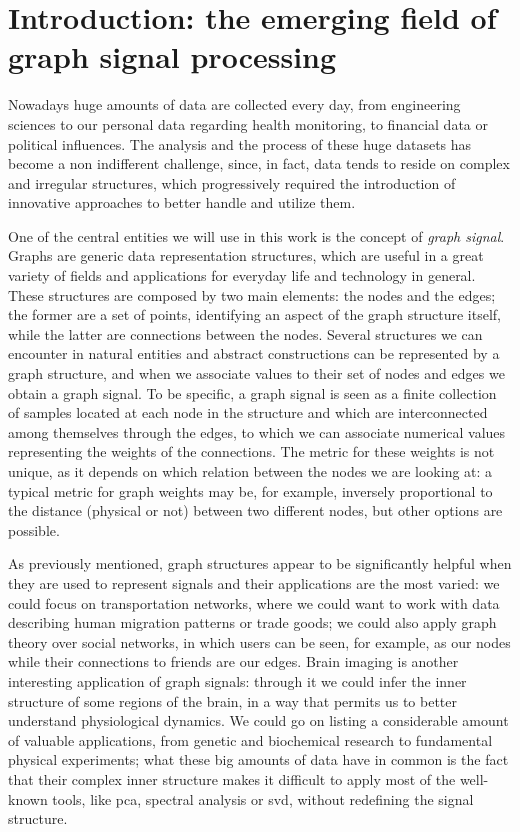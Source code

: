 \section{Introduction: the emerging field of graph signal processing}
Nowadays huge amounts of data are collected every day, from engineering sciences to our personal data regarding health monitoring, to financial data or political influences. The analysis and the process of these huge datasets has become a non indifferent challenge, since, in fact, data tends to reside on complex and irregular structures, which progressively required the introduction of innovative approaches to better handle and utilize them. \cite{Ortega2017} \cite{Sandry}

One of the central entities we will use in this work is the concept of \textit{graph signal}. Graphs are generic data representation structures, which are useful in a great variety of fields and applications for everyday life and technology in general. These structures are composed by two main elements: the nodes and the edges; the former are a set of points, identifying an aspect of the graph structure itself, while the latter are connections between the nodes. Several structures we can encounter in natural entities and abstract constructions can be represented by a graph structure, and when we associate values to their set of nodes and edges we obtain a graph signal. To be specific, a graph signal is seen as a finite collection of samples located at each node in the structure and which are interconnected among themselves through the edges, to which we can associate numerical values representing the weights of the connections. The metric for these weights is not unique, as it depends on which relation between the nodes we are looking at: a typical metric for graph weights may be, for example, inversely proportional to the distance (physical or not) between two different nodes, but other options are possible.

As previously mentioned, graph structures appear to be significantly helpful when they are used to represent signals and their applications are the most varied: we could focus on transportation networks, where we could want to work with data describing human migration patterns or trade goods; we could also apply graph theory over social networks, in which users can be seen, for example, as our nodes while their connections to friends are our edges. \cite{Ortega2017} Brain imaging is another interesting application of graph signals: through it we could infer the inner structure of some regions of the brain, in a way that permits us to better understand physiological dynamics.  \cite{Shuman2013} We could go on listing a considerable amount of valuable applications, from genetic and biochemical research to fundamental physical experiments; what these big amounts of data have in common is the fact that their complex inner structure makes it difficult to apply most of the well-known tools, like \gls{pca}, spectral analysis or \gls{svd}, without redefining the signal structure. \cite{Sandry}


